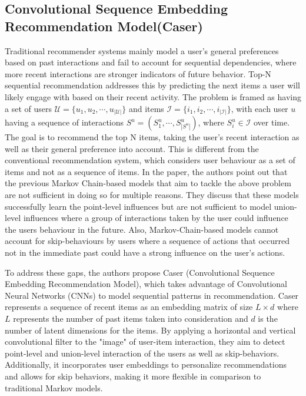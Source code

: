 \documentclass{ieeetj}
\begin{document}
\subsection{Convolutional Sequence Embedding Recommendation Model(Caser)\cite{tang2018personalized}}
Traditional recommender systems mainly model a user's general preferences based on past interactions and fail to account for sequential dependencies, where more recent interactions are stronger indicators of future behavior. Top-N sequential recommendation addresses this by predicting the next items a user will likely engage with based on their recent activity. The problem is framed as having a set of users $\mathcal{U} = \{u_1, u_2, \cdots, u_{|\mathcal{U}|}\}$ and items $\mathcal{I} = \{i_1, i_2, \cdots, i_{|\mathcal{I}|}\}$, with each user $u$ having a sequence of interactions $S^u = (S_1^u, \cdots, S_{|S^u|}^u)$, where $S_i^u \in \mathcal{I}$ over time. The goal is to recommend the top N items, taking the user's recent interaction as well as their general preference into account. This is different from the conventional recommendation system, which considers user behaviour as a set of items and not as a sequence of items.
In the paper, the authors point out that the previous Markov Chain-based models that aim to tackle the above problem are not sufficient in doing so for multiple reasons. They discuss that these models successfully learn the point-level influences but are not sufficient to model union-level influences where a group of interactions taken by the user could influence the users behaviour in the future. Also, Markov-Chain-based models cannot account for skip-behaviours by users where a sequence of actions that occurred not in the immediate past could have a strong influence on the user's actions. 

To address these gaps, the authors propose Caser (Convolutional Sequence Embedding Recommendation Model), which takes advantage of Convolutional Neural Networks (CNNs) to model sequential patterns in recommendation. Caser represents a sequence of recent items as an embedding matrix of size $L\times d$ where $L$ represents the number of past items taken into consideration and $d$ is the number of latent dimensions for the items. By applying a horizontal and vertical convolutional filter to the "image" of user-item interaction, they aim to detect point-level and union-level interaction of the users as well as skip-behaviors. Additionally, it incorporates user embeddings to personalize recommendations and allows for skip behaviors, making it more flexible in comparison to traditional Markov models.
\end{document}
